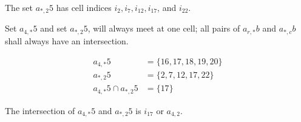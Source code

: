 \documentclass[letterpaper, twoside,12pt]{article}
\begin{document}
    The set $a_{*,2}5$ has cell indices $i_{2}, i_{7}, i_{12}, i_{17}$, and $i_{22}$.

    Set $a_{4,*}5$ and set $a_{*,2}5$, will always meet at one cell; all pairs of $a_{r,*}b$ and $a_{*,c}b$ shall always have an intersection.

    \begin{equation*}
        \begin{split}
            a_{4,*}5 &= \{16, 17, 18, 19, 20 \} \\
            a_{*,2}5 &= \{2, 7, 12, 17, 22 \} \\
            a_{4,*}5 \cap a_{*,2}5 &= \{17\}
        \end{split}
    \end{equation*}

    The intersection of $a_{4,*}5$ and $a_{*,2}5$ is $i_{17}$ or $a_{4,2}$.
\end{document}
